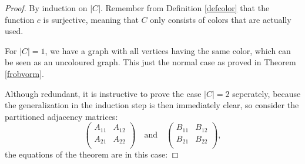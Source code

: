 \documentclass[a4paper,11pt]{report}
\begin{document}
\begin{proof}
   By induction on $|C|$. Remember from Definition \ref{defcolor} that the function $c$ is surjective, meaning that
  $C$ only consists of colors that are actually used.
    
   For $|C|=1$, we have a graph with all vertices having the same color, which can be seen as an uncoloured graph. This just 
   the normal case as proved in Theorem \ref{frobvorm}.
      
Although redundant, it is instructive to prove the case $|C|=2$ seperately, because the 
generalization in the induction step is then immediately clear, so consider 
the partitioned adjacency matrices:
$$\begin{pmatrix}
A_{11} & A_{12}\\
A_{21} & A_{22}\\
\end{pmatrix} \quad \text{and} \quad
\begin{pmatrix}
B_{11} & B_{12}\\
B_{21} & B_{22}\\
\end{pmatrix},$$
the equations of the theorem are in this case:


\end{proof}
\end{document}
